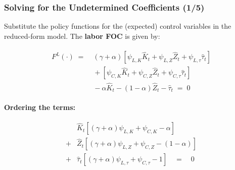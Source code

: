 \documentclass[10pt,c,aspectratio=1610,handout]{beamer}
\begin{document}
\begin{frame}%
  \frametitle{Solving for the Undetermined Coefficients (1/5)}%
  Substitute the policy functions for the (expected) control variables in the reduced-form model. The \textbf{labor FOC} is given by:%
  \begin{footnotesize}%
    \begin{align*}%
      \begin{split}%
        F^L(\cdot) \; = & \; \left(\gamma+\alpha\right) \left[ \psi_{L,K}\hat{K}_t + \psi_{L,Z} \hat{Z}_{t} + \psi_{L,\tau} \hat{\tau}_{t} \right]\\%
        & \; + \left[ \psi_{C,K} \hat{K}_t + \psi_{C,Z} \hat{Z}_{t} + \psi_{C,\tau} \hat{\tau}_{t} \right]\\%
        & \; - \alpha \hat{K}_t - \left(1-\alpha\right) \hat{Z}_t - \hat{\tau}_t \; = \; 0%
      \end{split}%
  \end{align*}%
  \end{footnotesize}%
  \pause%
  \textbf{Ordering the terms:}%
  \begin{footnotesize}%
    \begin{align}%
      \begin{split}%
        & \hat{K}_t \left[ \left(\gamma+\alpha\right) \psi_{L,K} + \psi_{C,K} - \alpha \right]\\%
         + & \hat{Z}_{t} \left[ \left(\gamma+\alpha\right) \psi_{L,Z} + \psi_{C,Z} - \left(1-\alpha\right) \right]\\%
         + & \hat{\tau}_{t} \left[ \left(\gamma+\alpha\right) \psi_{L,\tau} + \psi_{C,\tau} - 1 \right] \quad = \quad 0%
      \end{split}\label{eq:euler_policy}%
    \end{align}%
  \end{footnotesize}%
\end{frame}%
\end{document}
